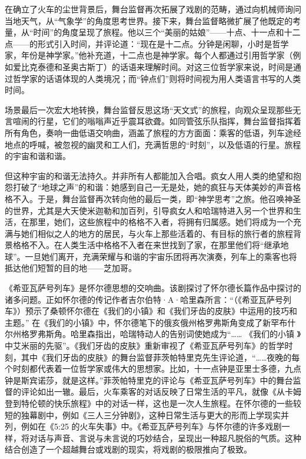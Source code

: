 \documentclass[lang=cn,newtx,12pt,scheme=chinese]{elegantbook}
\begin{document}
在确立了火车的尘世背景后，舞台监督再次拓展了戏剧的范畴，通过向机械师询问当地天气，从“气象学”的角度思考世界。接下来，舞台监督略微扩展了他既定的考量，从“时间”的角度呈现了旅程。他以三个“美丽的姑娘”——十点、十一点和十二点——的形式引入时间，并评论道：“现在是十二点。分钟是闲聊，小时是哲学家，年份是神学家。”他补充道，十二点也是神学家。每个人都通过引用哲学家（例如爱比克泰德和圣奥古斯丁）的话语来理解时间。对这三位哲学家来说，时间是通过哲学家的话语体现的人类境况；而“钟点们”则将时间视为用人类语言书写的人类时间。

场景最后一次宏大地转换，舞台监督反思这场“天文式”的旅程，向观众呈现那些无言喧闹的行星，它们的嗡嗡声近乎震耳欲聋。如同管弦乐队指挥，舞台监督指挥着所有角色，奏响一曲低语交响曲，涵盖了旅程的方方面面：乘客的低语，列车途经地点的呼喊，被忽视的幽灵和工人们，充满哲思的“时刻”，以及低语的行星。旅程的宇宙和谐和谐。

但这种宇宙的和谐无法持久。并非所有人都能加入合唱。疯女人用人类的绝望和抱怨打破了“地球之声”的和谐：她感到自己一无是处，她的疯狂与天体美妙的声音格格不入。于是，舞台监督再次转向他的最后一类，即“神学思考”之旅。他召唤神圣的世界，尤其是大天使米迦勒和加百列，引导疯女人和哈瑞特进入另一个世界和生活，在那里，她们，这些旅程中的格格不入者，将拥有归属感。她们将成为一个充满与她们相似之人的地方的居民，与火车上那些活着的、有目标的旅行者的旅程背景格格不入。在人类生活中格格不入者在来世找到了家，在那里他们将“继承地球”。一旦她们离开，充满荣耀与和谐的宇宙乐团将再次演奏，列车上的乘客也将抵达他们短暂的目的地——芝加哥。

《希亚瓦萨号列车》是怀尔德思想的交响曲。该剧探讨了怀尔德长篇作品中探讨的诸多问题。正如怀尔德的传记作者吉尔伯特·A·哈里森所言：“（《希亚瓦萨号列车》）预示了桑顿怀尔德在《我们的小镇》和《我们牙齿的皮肤》中运用的技巧和主题。” 在《我们的小镇》中，怀尔德笔下的俄亥俄州格罗弗斯角变成了新罕布什尔州格罗弗斯角。哈里森指出，哈瑞特动人的告别词使她成为“…… 《我们的小镇 》中艾米丽的先驱”。《我们牙齿的皮肤》重新审视了《希亚瓦萨号列车》的哲学时刻，其中《我们牙齿的皮肤》的舞台监督菲茨帕特里克先生评论道，“……夜晚的每个时刻都代表着一位哲学家或伟大的思想家。比如，十一点钟是亚里士多德，九点钟是斯宾诺莎，就是这样。”菲茨帕特里克的评论与《希亚瓦萨号列车》中的舞台监督的评论如出一辙。最后，火车乘客的对话反映了日常生活的平凡，就像《从卡姆登到特伦顿的快乐旅程》中的对话一样，这也是一次人生旅程。在怀尔德的一些较短的独幕剧中，例如《三人三分钟剧》，这种日常生活与更大的形而上学现实并列，例如在《5:25 的火车失事》中。《希亚瓦萨号列车》与怀尔德的许多戏剧一样，将对话与声音、言说与未言说的巧妙结合，呈现出一种超凡脱俗的气质。这种结合创造了一个超越舞台或戏剧的现实，将戏剧的极限推向了极致。
\end{document}
